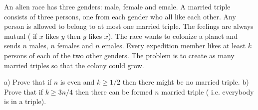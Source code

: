 An alien race has three genders: male, female and emale. A married triple consists of three persons, one from each gender who all like each other. Any person is allowed to belong to at most one married triple. The feelings are always mutual ( if $x$ likes $y$ then $y$ likes $x$).
The race wants to colonize a planet and sends $n$ males, $n$ females and $n$ emales. Every expedition member likes at least $k$ persons of each of the two other genders. The problem is to create as many married triples so that the colony could grow.

a) Prove that if $n$ is even and $k\geq 1/2$ then there might be no married triple.
b) Prove that if $k \geq 3n/4$ then there can be formed $n$ married triple ( i.e. everybody is in a triple).